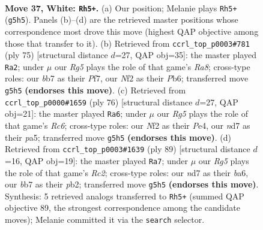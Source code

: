 \documentclass[11pt]{article}
\begin{document}
\clearpage

\begin{figure}[p]\centering
\begin{subfigure}{0.46\textwidth}\centering
\resizebox{\linewidth}{!}{%
\newchessgame
\chessboard[
  setfen={5r1k/1b1n4/8/3p2R1/p7/P5P1/1PP2N2/2K5 w - - 8 37},
  showmover=false,
  pgfstyle=straightmove, color=movearrow, markmove={g5-h5}
]}
\caption{}
\end{subfigure}\hfill
\begin{subfigure}{0.46\textwidth}\centering
\resizebox{\linewidth}{!}{%
\newchessgame
\chessboard[
  setfen={8/5pk1/1p4p1/7p/PR1K4/5PP1/7P/r7 b - - 0 38},
  showmover=false,
  pgfstyle=straightmove, color=movearrow, markmove={a1-a2}
]}
\caption{}
\end{subfigure}
\\[4pt]
\begin{subfigure}{0.46\textwidth}\centering
\resizebox{\linewidth}{!}{%
\newchessgame
\chessboard[
  setfen={8/5k2/2R3p1/p6p/r3P3/2P4P/6PK/8 w - - 1 39},
  showmover=false,
  pgfstyle=straightmove, color=movearrow, markmove={c6-a6}
]}
\caption{}
\end{subfigure}\hfill
\begin{subfigure}{0.46\textwidth}\centering
\resizebox{\linewidth}{!}{%
\newchessgame
\chessboard[
  setfen={7k/2r2ppp/B7/4p3/4PnP1/2P5/1P6/1K3R2 b - - 1 45},
  showmover=false,
  pgfstyle=straightmove, color=movearrow, markmove={c7-a7}
]}
\caption{}
\end{subfigure}
\caption{\textbf{Move 37, White: \texttt{Rh5+}.} (a) Our position; Melanie plays \texttt{Rh5+} (\texttt{g5h5}). Panels (b)--(d) are the retrieved master positions whose correspondence most drove this move (highest QAP objective among those that transfer to it). (b) Retrieved from \texttt{ccrl\_top\_p0003\#781} (ply 75) [structural distance $d$=27, QAP obj=35]: the master played \texttt{Ra2}; under $\mu$ our \emph{Rg5} plays the role of that game's \emph{Ra8}; cross-type roles: our \emph{b}b7 as their \emph{P}f7, our \emph{N}f2 as their \emph{P}b6; transferred move \texttt{g5h5} \textbf{(endorses this move)}. (c) Retrieved from \texttt{ccrl\_top\_p0000\#1659} (ply 76) [structural distance $d$=27, QAP obj=21]: the master played \texttt{Ra6}; under $\mu$ our \emph{Rg5} plays the role of that game's \emph{Rc6}; cross-type roles: our \emph{N}f2 as their \emph{P}e4, our \emph{n}d7 as their \emph{p}a5; transferred move \texttt{g5h5} \textbf{(endorses this move)}. (d) Retrieved from \texttt{ccrl\_top\_p0003\#1639} (ply 89) [structural distance $d$=16, QAP obj=19]: the master played \texttt{Ra7}; under $\mu$ our \emph{Rg5} plays the role of that game's \emph{Rc2}; cross-type roles: our \emph{n}d7 as their \emph{b}a6, our \emph{b}b7 as their \emph{p}b2; transferred move \texttt{g5h5} \textbf{(endorses this move)}. Synthesis: 5 retrieved analogs transferred to \texttt{Rh5+} (summed QAP objective 89, the strongest correspondence among the candidate moves); Melanie committed it via the \texttt{search} selector.}
\label{fig:thought-m72}
\end{figure}
\end{document}

